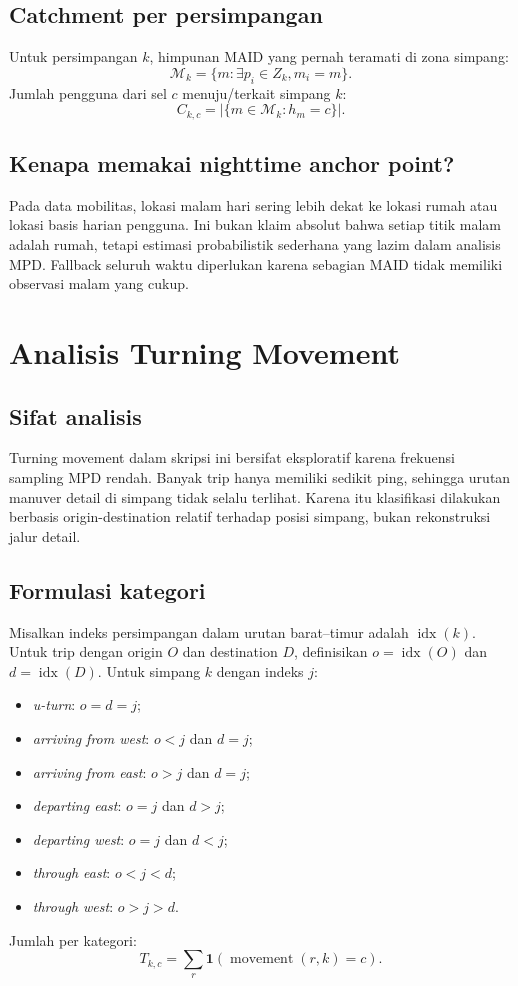 \documentclass[11pt,a4paper]{article}
\begin{document}
\subsection{Catchment per persimpangan}
Untuk persimpangan $k$, himpunan MAID yang pernah teramati di zona simpang:
\[
\mathcal{M}_k=\{m:\exists p_i\in Z_k, m_i=m\}.
\]
Jumlah pengguna dari sel $c$ menuju/terkait simpang $k$:
\[
C_{k,c}=|\{m\in\mathcal{M}_k:h_m=c\}|.
\]

\subsection{Kenapa memakai nighttime anchor point?}
Pada data mobilitas, lokasi malam hari sering lebih dekat ke lokasi rumah atau lokasi basis harian pengguna. Ini bukan klaim absolut bahwa setiap titik malam adalah rumah, tetapi estimasi probabilistik sederhana yang lazim dalam analisis MPD. Fallback seluruh waktu diperlukan karena sebagian MAID tidak memiliki observasi malam yang cukup.

\section{Analisis Turning Movement}
\subsection{Sifat analisis}
Turning movement dalam skripsi ini bersifat eksploratif karena frekuensi sampling MPD rendah. Banyak trip hanya memiliki sedikit ping, sehingga urutan manuver detail di simpang tidak selalu terlihat. Karena itu klasifikasi dilakukan berbasis origin-destination relatif terhadap posisi simpang, bukan rekonstruksi jalur detail.

\subsection{Formulasi kategori}
Misalkan indeks persimpangan dalam urutan barat--timur adalah $\operatorname{idx}(k)$. Untuk trip dengan origin $O$ dan destination $D$, definisikan $o=\operatorname{idx}(O)$ dan $d=\operatorname{idx}(D)$. Untuk simpang $k$ dengan indeks $j$:
\begin{itemize}
    \item \textit{u-turn}: $o=d=j$;
    \item \textit{arriving from west}: $o<j$ dan $d=j$;
    \item \textit{arriving from east}: $o>j$ dan $d=j$;
    \item \textit{departing east}: $o=j$ dan $d>j$;
    \item \textit{departing west}: $o=j$ dan $d<j$;
    \item \textit{through east}: $o<j<d$;
    \item \textit{through west}: $o>j>d$.
\end{itemize}
Jumlah per kategori:
\[
T_{k,c}=\sum_r\mathbf{1}(\operatorname{movement}(r,k)=c).
\]
\end{document}
